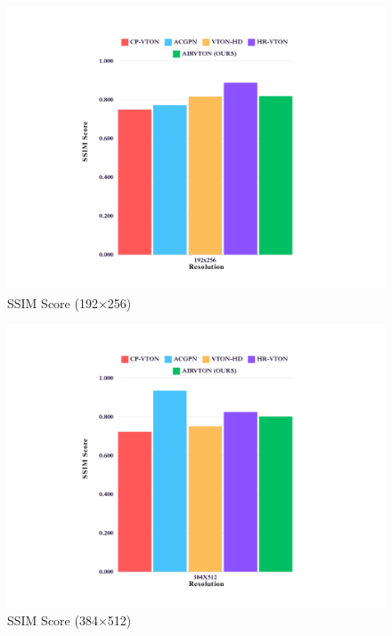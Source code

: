\begin{figure}
    \includegraphics[width=\textwidth]{components/images/5.png}
    \caption{SSIM Score (192$\times$256)}
    \label{fig:ssim-score-low}
\end{figure}

\begin{figure}
    \includegraphics[width=\textwidth]{components/images/6.png}
    \caption{SSIM Score (384$\times$512)}
    \label{fig:ssim-score-med}
\end{figure}

